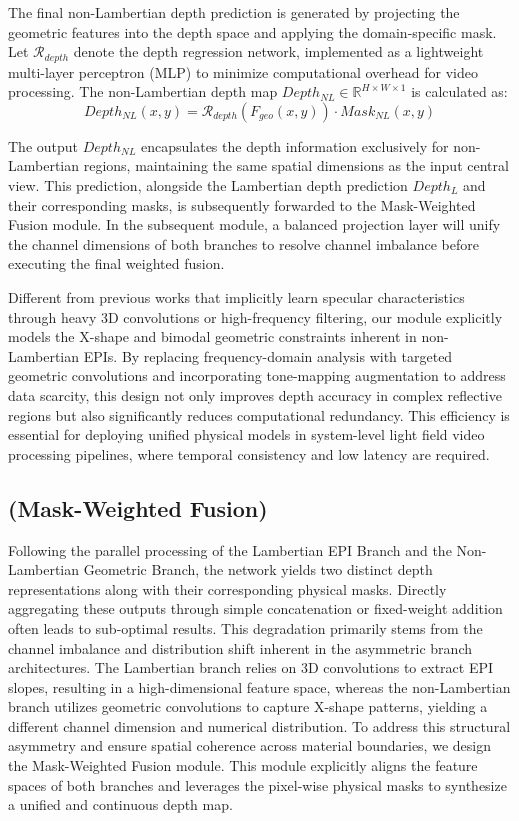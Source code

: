 The final non-Lambertian depth prediction is generated by projecting the geometric features into the depth space and applying the domain-specific mask. Let $\mathcal{R}_{depth}$ denote the depth regression network, implemented as a lightweight multi-layer perceptron (MLP) to minimize computational overhead for video processing. The non-Lambertian depth map $Depth_{NL} \in \mathbb{R}^{H \times W \times 1}$ is calculated as:
\begin{equation}
\label{eq:eq21}
Depth_{NL}(x, y) = \mathcal{R}_{depth} \left( F_{geo}(x, y) \right) \cdot Mask_{NL}(x, y)
\end{equation}

The output $Depth_{NL}$ encapsulates the depth information exclusively for non-Lambertian regions, maintaining the same spatial dimensions as the input central view. This prediction, alongside the Lambertian depth prediction $Depth_L$ and their corresponding masks, is subsequently forwarded to the Mask-Weighted Fusion module. In the subsequent module, a balanced projection layer will unify the channel dimensions of both branches to resolve channel imbalance before executing the final weighted fusion.

Different from previous works that implicitly learn specular characteristics through heavy 3D convolutions or high-frequency filtering, our module explicitly models the X-shape and bimodal geometric constraints inherent in non-Lambertian EPIs. By replacing frequency-domain analysis with targeted geometric convolutions and incorporating tone-mapping augmentation to address data scarcity, this design not only improves depth accuracy in complex reflective regions but also significantly reduces computational redundancy. This efficiency is essential for deploying unified physical models in system-level light field video processing pipelines, where temporal consistency and low latency are required.

\subsection{(Mask-Weighted Fusion)}

Following the parallel processing of the Lambertian EPI Branch and the Non-Lambertian Geometric Branch, the network yields two distinct depth representations along with their corresponding physical masks. Directly aggregating these outputs through simple concatenation or fixed-weight addition often leads to sub-optimal results. This degradation primarily stems from the channel imbalance and distribution shift inherent in the asymmetric branch architectures. The Lambertian branch relies on 3D convolutions to extract EPI slopes, resulting in a high-dimensional feature space, whereas the non-Lambertian branch utilizes geometric convolutions to capture X-shape patterns, yielding a different channel dimension and numerical distribution. To address this structural asymmetry and ensure spatial coherence across material boundaries, we design the Mask-Weighted Fusion module. This module explicitly aligns the feature spaces of both branches and leverages the pixel-wise physical masks to synthesize a unified and continuous depth map.


